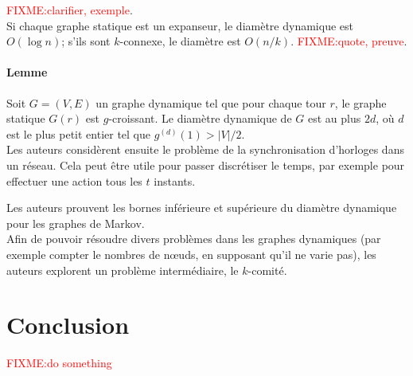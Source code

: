 \documentclass[12pt,a4paper]{article}
\begin{document}
\textcolor{red}{FIXME:\@ clarifier, exemple}.\\

Si chaque graphe statique est un expanseur, le diamètre dynamique est
\(O(\log n)\); s'ils sont \(k\)-connexe, le diamètre est \(O(n/k)\).
\textcolor{red}{FIXME:\@ quote, preuve}.

\paragraph{Lemme} Soit \(G = (V, E)\) un graphe dynamique tel que pour
chaque tour \(r\), le graphe statique \(G(r)\) est \(g\)-croissant. Le
diamètre dynamique de \(G\) est au plus \(2d\), où \(d\) est le plus
petit entier tel que \(g^{(d)}(1) > |V|/2\).\\

Les auteurs considèrent ensuite le problème de la synchronisation
d'horloges dans un réseau. Cela peut être utile pour passer
discrétiser le temps, par exemple pour effectuer une action tous les
\(t\) instants.

Les auteurs prouvent les bornes inférieure et supérieure du
diamètre dynamique pour les graphes de Markov.\\

Afin de pouvoir résoudre divers problèmes dans les graphes dynamiques
(par exemple compter le nombres de nœuds, en supposant qu'il ne varie
pas), les auteurs explorent un problème intermédiaire, le
\(k\)-comité.

\section{Conclusion}
\textcolor{red}{FIXME:\@ do something}

\printbibliography{}
\end{document}
